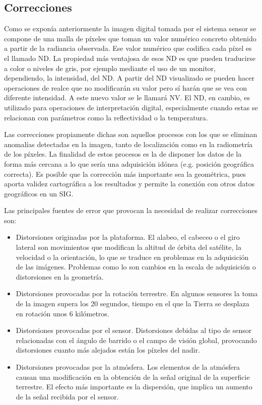 \subsection{Correcciones}
Como se exponía anteriormente la imagen digital tomada por el sistema sensor se compone de una malla de píxeles que toman un valor numérico concreto obtenido a partir de la radiancia observada. Ese valor numérico que codifica cada píxel es el llamado \ac{ND}. La propiedad más ventajosa de esos \ac{ND} es que pueden traducirse a color o niveles de gris, por ejemplo mediante el uso de un monitor, dependiendo, la intensidad, del \ac{ND}. A partir del \ac{ND} visualizado se pueden hacer operaciones de realce que no modificarán su valor pero sí harán que se vea con diferente intensidad. A este nuevo valor se le llamará \ac{NV}. El \ac{ND}, en cambio, es utilizado para operaciones de interpretación digital, especialmente cuando estas se relacionan con parámetros como la reflectividad o la temperatura.%


Las correcciones propiamente dichas son aquellos procesos con los que se eliminan anomalías detectadas en la imagen, tanto de localización como en la radiometría de los píxeles. La finalidad de estos procesos es la de disponer los datos de la forma más cercana a lo que sería una adquisición idónea (e.g. posición geográfica correcta). Es posible que la corrección más importante sea la geométrica, pues aporta validez cartográfica a los resultados y permite la conexión con otros datos geográficos en un \ac{SIG}.%

Las principales fuentes de error que provocan la necesidad de realizar correcciones son:
\begin{itemize}
	\item Distorsiones originadas por la plataforma. El alabeo, el cabeceo o el giro lateral son movimientos que modifican la altitud de órbita del satélite, la velocidad o la orientación, lo que se traduce en problemas en la adquisición de las imágenes. Problemas como lo son cambios en la escala de adquisición o distorsiones en la geometría.
	\item Distorsiones provocadas por la rotación terrestre. En algunos sensores la toma de la imagen supera los 20 segundos, tiempo en el que la Tierra se desplaza en rotación unos 6 kilómetros.
	\item Distorsiones provocadas por el sensor. Distorsiones debidas al tipo de sensor relacionadas con el ángulo de barrido o el campo de visión global, provocando distorsiones cuanto más alejados están los píxeles del nadir.
	\item Distorsiones provocadas por la atmósfera. Los elementos de la atmósfera causan una modificación en la obtención de la señal original de la superficie terrestre. El efecto más importante es la dispersión, que implica un aumento de la señal recibida por el sensor.
\end{itemize}

